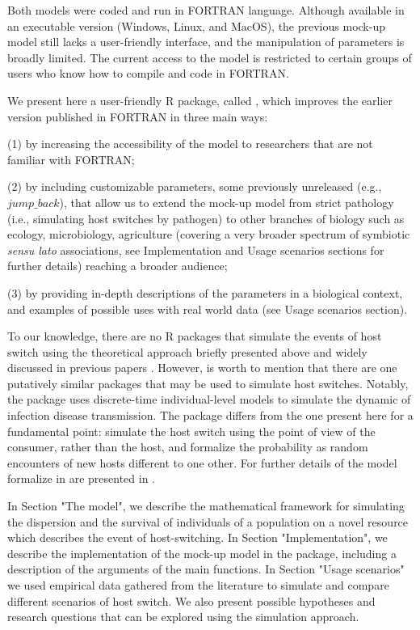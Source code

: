 Both models were coded and run in FORTRAN language. Although available in an executable version (Windows, Linux, and MacOS), the previous mock-up model still lacks a user-friendly interface, and the manipulation of parameters is broadly limited. The current access to the model is restricted to certain groups of users who know how to compile and code in FORTRAN.

We present here a user-friendly R package, called , which improves the earlier version published in FORTRAN \citep{araujo_understanding_2015, feronato_accidents_2021} in three main ways:

(1) by increasing the accessibility of the model to researchers that are not familiar with FORTRAN;

(2) by including customizable parameters, some previously unreleased (e.g., $jump\_back$), that allow us to extend the mock-up model from strict pathology (i.e., simulating host switches by pathogen) to other branches of biology such as ecology, microbiology, agriculture (covering a very broader spectrum of symbiotic \emph{sensu lato} associations, see Implementation and Usage scenarios sections for further details) reaching a broader audience;

(3) by providing in-depth descriptions of the parameters in a biological context, and examples of possible uses with real world data (see Usage scenarios section).

To our knowledge, there are no R packages that simulate the events of host switch using the theoretical approach briefly presented above and widely discussed in previous papers \citep{araujo_understanding_2015, agosta_how_2010, brooks_stockholm_2019}. However, is worth to mention that there are one putatively similar packages that may be used to simulate host switches. Notably, the package  \citep{RJ-2020-020} uses discrete-time individual-level models to simulate the dynamic of infection disease transmission. The  package differs from the one present here for a fundamental point:  simulate the host switch using the point of view of the consumer, rather than the host, and formalize the probability as random encounters of new hosts different to one other. For further details of the model formalize in  are presented in \citet{deardon_inference_2010}.

In Section "The model", we describe the mathematical framework for simulating the dispersion and the survival of individuals of a population on a novel resource which describes the event of host-switching. In Section "Implementation",  we describe the implementation of the mock-up model in the  package, including a description of the arguments of the main functions.
In Section "Usage scenarios" we used empirical data gathered from the literature to simulate and compare different scenarios of host switch. We also present possible hypotheses and research questions that can be explored using the simulation approach.

